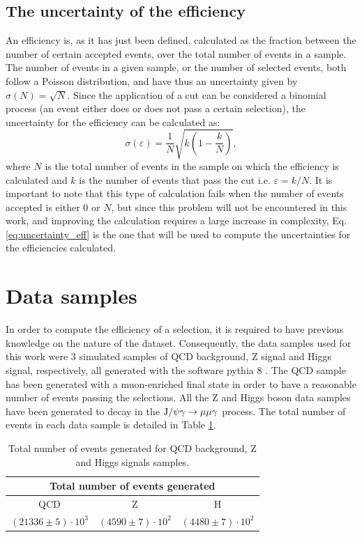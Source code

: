 \documentclass[11pt, a4paper]{article}
\newcommand{\JPsi}{{\rm J}/\psi}
\begin{document}
\subsection{The uncertainty of the efficiency}
An efficiency is, as it has just been defined, calculated as the fraction between the number of certain accepted events, over the total number of events in a sample. The number of events in a given sample, or the number of selected events, both follow a Poisson distribution, and have thus an uncertainty given by $\sigma(N) = \sqrt{N}$. Since the application of a cut can be considered a binomial process (an event either does or does not pass a certain selection), the uncertainty for the efficiency can be calculated \cite{paterno2004calculating} as:
\begin{equation}
    \sigma(\varepsilon) = \frac{1}{N}\sqrt{k\left (1-\frac{k}{N}\right )},
    \label{eq:uncertainty_eff}
\end{equation}
where $N$ is the total number of events in the sample on which the efficiency is calculated and $k$ is the number of events that pass the cut i.e. $\varepsilon = k/N$. It is important to note that this type of calculation fails when the number of events accepted is either 0 or $N$, but since this problem will not be encountered in this work, and improving the calculation requires a large increase in complexity, Eq. \ref{eq:uncertainty_eff} is the one that will be used to compute the uncertainties for the efficiencies calculated.

\section{Data samples}
In order to compute the efficiency of a selection, it is required to have previous knowledge on the nature of the dataset. Consequently, the data samples used for this work were 3 simulated samples of QCD background, Z signal and Higgs signal, respectively, all generated with the software {\sc pythia 8} \cite{pythia}. The QCD sample has been generated with a muon-enriched final state in order to have a reasonable number of events passing the selections. All the Z and Higgs boson data samples have been generated to decay in the $\JPsi\gamma\rightarrow \mu\mu\gamma$ process. The total number of events in each data sample is detailed in Table \ref{tab:events_generated}.

\begin{table}[htbp]
    \centering
        \begin{tabular}{ccc}
        \toprule
        \multicolumn{3}{c}{Total number of events generated} \\ \midrule
        QCD   & Z     & H \\
        $(21336\pm5)\cdot 10^{3}$ & $(4590\pm7)\cdot 10^{2}$ & $(4480\pm7)\cdot 10^{2}$ \\ \bottomrule
        \end{tabular}%
        \caption{Total number of events generated for QCD background, Z and Higgs signals samples.
    \label{tab:events_generated}}
\end{table}%
\end{document}

